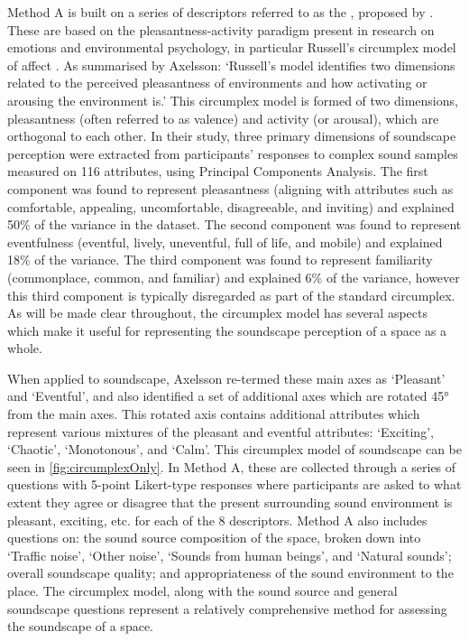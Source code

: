 Method A is built on a series of descriptors referred to as the , proposed by \citet{Axelsson2010principal}. These  are based on the pleasantness-activity paradigm present in research on emotions and environmental psychology, in particular Russell's circumplex model of affect \citep{Russell1980circumplex}. As summarised by Axelsson: `Russell's model identifies two dimensions related to the perceived pleasantness of environments and how activating or arousing the environment is.' This circumplex model is formed of two dimensions, pleasantness (often referred to as valence) and activity (or arousal), which are orthogonal to each other. In their study, three primary dimensions of soundscape perception were extracted from participants' responses to complex sound samples measured on 116 attributes, using Principal Components Analysis. The first component was found to represent pleasantness (aligning with attributes such as comfortable, appealing, uncomfortable, disagreeable, and inviting) and explained 50\% of the variance in the dataset. The second component was found to represent eventfulness (eventful, lively, uneventful, full of life, and mobile) and explained 18\% of the variance. The third component was found to represent familiarity (commonplace, common, and familiar) and explained 6\% of the variance, however this third component is typically disregarded as part of the standard circumplex. As will be made clear throughout, the circumplex model has several aspects which make it useful for representing the soundscape perception of a space as a whole.

When applied to soundscape, Axelsson re-termed these main axes as `Pleasant' and `Eventful', and also identified a set of additional axes which are rotated 45° from the main axes. This rotated axis contains additional attributes which represent various mixtures of the pleasant and eventful attributes: `Exciting', `Chaotic', `Monotonous', and `Calm'. This circumplex model of soundscape can be seen in \cref{fig:circumplexOnly}. In Method A, these  are collected through a series of questions with 5-point Likert-type responses where participants are asked to what extent they agree or disagree that the present surrounding sound environment is pleasant, exciting, etc. for each of the 8 descriptors. Method A also includes questions on: the sound source composition of the space, broken down into `Traffic noise', `Other noise', `Sounds from human beings', and `Natural sounds'; overall soundscape quality; and appropriateness of the sound environment to the place. The circumplex model, along with the sound source and general soundscape questions represent a relatively comprehensive method for assessing the soundscape of a space.


